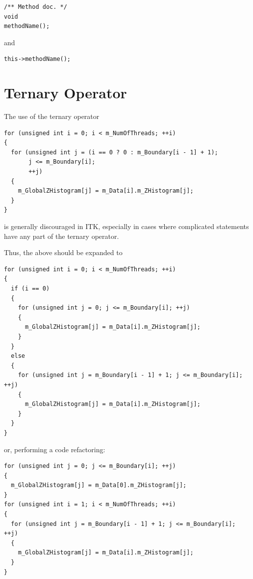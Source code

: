 \small
\begin{verbatim}
/** Method doc. */
void
methodName();
\end{verbatim}
\normalsize

and

\small
\begin{verbatim}
this->methodName();
\end{verbatim}
\normalsize


\section{Ternary Operator}%
\label{sec:TernaryOperator}

The use of the ternary operator

\small
\begin{verbatim}
for (unsigned int i = 0; i < m_NumOfThreads; ++i)
{
  for (unsigned int j = (i == 0 ? 0 : m_Boundary[i - 1] + 1);
       j <= m_Boundary[i];
       ++j)
  {
    m_GlobalZHistogram[j] = m_Data[i].m_ZHistogram[j];
  }
}
\end{verbatim}
\normalsize

is generally discouraged in ITK, especially in cases where complicated
statements have any part of the ternary operator.

Thus, the above should be expanded to

\small
\begin{verbatim}
for (unsigned int i = 0; i < m_NumOfThreads; ++i)
{
  if (i == 0)
  {
    for (unsigned int j = 0; j <= m_Boundary[i]; ++j)
    {
      m_GlobalZHistogram[j] = m_Data[i].m_ZHistogram[j];
    }
  }
  else
  {
    for (unsigned int j = m_Boundary[i - 1] + 1; j <= m_Boundary[i]; ++j)
    {
      m_GlobalZHistogram[j] = m_Data[i].m_ZHistogram[j];
    }
  }
}
\end{verbatim}
\normalsize

or, performing a code refactoring:

\small
\begin{verbatim}
for (unsigned int j = 0; j <= m_Boundary[i]; ++j)
{
  m_GlobalZHistogram[j] = m_Data[0].m_ZHistogram[j];
}
for (unsigned int i = 1; i < m_NumOfThreads; ++i)
{
  for (unsigned int j = m_Boundary[i - 1] + 1; j <= m_Boundary[i]; ++j)
  {
    m_GlobalZHistogram[j] = m_Data[i].m_ZHistogram[j];
  }
}
\end{verbatim}
\normalsize

